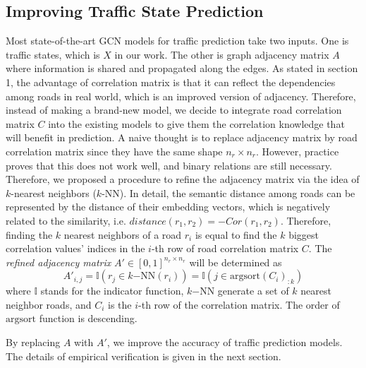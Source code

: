 \subsection{Improving Traffic State Prediction}
Most state-of-the-art GCN models for traffic prediction take two inputs. One is traffic states, which is $X$ in our work. The other is graph adjacency matrix $A$ where information is shared and propagated along the edges. As stated in section 1, the advantage of correlation matrix is that it can reflect the dependencies among roads in real world, which is an improved version of adjacency. Therefore, instead of making a brand-new model, we decide to integrate road correlation matrix $C$ into the existing models to give them the correlation knowledge that will benefit in prediction. A naive thought is to replace adjacency matrix by road correlation matrix since they have the same shape $n_r\times n_r$. However, practice proves that this does not work well, and binary relations are still necessary. Therefore, we proposed a procedure to refine the adjacency matrix via the idea of $k$-nearest neighbors ($k$-NN)\cite{knn}. In detail, the semantic distance among roads can be represented by the distance of their embedding vectors, which is negatively related to the similarity, i.e. $distance(r_1, r_2)=-Cor(r_1, r_2)$. Therefore, finding the $k$ nearest neighbors of a road $r_i$ is equal to find the $k$ biggest correlation values' indices in the $i$-th row of road correlation matrix $C$. The \textit{refined adjacency matrix} $A'\in[0, 1]^{n_r\times n_r}$ will be determined as
\begin{equation}
    A'_{i, j}=\mathbb{I}(r_j\in k\mathrm{-NN}(r_i))=\mathbb{I}(j\in \mathrm{argsort}(C_i)_{:k})
\end{equation}
where $\mathbb{I}$ stands for the indicator function, $k\mathrm{-NN}$ generate a set of $k$ nearest neighbor roads, and $C_i$ is the $i$-th row of the correlation matrix. The order of $\mathrm{argsort}$ function is descending.

By replacing $A$ with $A'$, we improve the accuracy of traffic prediction models. The details of empirical verification is given in the next section.
